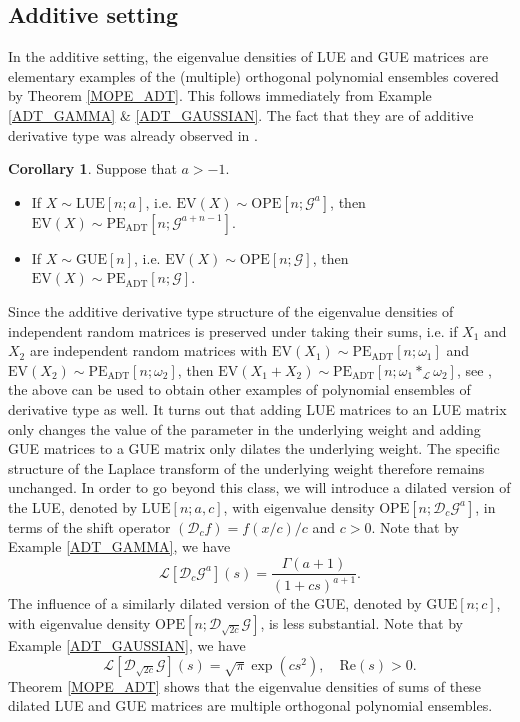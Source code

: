 \documentclass[a4paper,12pt,oneside]{article}
\theoremstyle{definition}
\newtheorem{cor}[defi]{Corollary}
\newcommand{\om}{\omega}
\newcommand{\LT}[1]{\mathcal{L}#1}
\begin{document}
\subsection{Additive setting} \label{EX_A}

In the additive setting, the eigenvalue densities of LUE and GUE matrices are elementary examples of the (multiple) orthogonal polynomial ensembles covered by Theorem \ref{MOPE_ADT}. This follows immediately from Example \ref{ADT_GAMMA} \& \ref{ADT_GAUSSIAN}. The fact that they are of additive derivative type was already observed in \cite[Ex. 2.4]{FKK:PolyaE}.

\begin{cor} \label{OPE_ADT_EX} Suppose that $a>-1$.
\begin{itemize}
    \item[$i)$] If $X\sim\text{LUE}[n;a]$, i.e. $\text{EV}(X)\sim\text{OPE}[n;\mathcal{G}^a]$, then $\text{EV}(X)\sim\text{PE}_{\text{ADT}}[n;\mathcal{G}^{a+n-1}]$.
    \item[$ii)$] If $X\sim\text{GUE}[n]$, i.e. $\text{EV}(X)\sim\text{OPE}[n;\mathcal{G}]$, then $\text{EV}(X)\sim\text{PE}_{\text{ADT}}[n;\mathcal{G}]$.
\end{itemize}
\end{cor}

Since the additive derivative type structure of the eigenvalue densities of independent random matrices is preserved under taking their sums, i.e. if $X_1$ and $X_2$ are independent random matrices with $\text{EV}(X_1)\sim\text{PE}_{\text{ADT}}[n;\om_1]$ and $\text{EV}(X_2)\sim\text{PE}_{\text{ADT}}[n;\om_2]$, then $\text{EV}(X_1+X_2)\sim\text{PE}_{\text{ADT}}[n;\om_1\ast_{\LT{}}\om_2]$, see \cite{FKK:PolyaE}, the above can be used to obtain other examples of polynomial ensembles of derivative type as well. It turns out that adding LUE matrices to an LUE matrix only changes the value of the parameter in the underlying weight and adding GUE matrices to a GUE matrix only dilates the underlying weight. The specific structure of the Laplace transform of the underlying weight therefore remains unchanged. In order to go beyond this class, we will introduce a dilated version of the LUE, denoted by $\text{LUE}[n;a,c]$, with eigenvalue density $\text{OPE}[n;\mathcal{D}_c\mathcal{G}^{a}]$, in terms of the shift operator $(\mathcal{D}_c f) =f(x/c)/c$ and $c>0$. Note that by Example \ref{ADT_GAMMA}, we have
    $$ \LT{[\mathcal{D}_c\mathcal{G}^{a}]}(s)  = \frac{\Gamma(a+1)}{(1+cs)^{a+1}}. $$
The influence of a similarly dilated version of the GUE, denoted by $\text{GUE}[n;c]$, with eigenvalue density $\text{OPE}[n;\mathcal{D}_{\sqrt{2c}}\mathcal{G}]$, is less substantial. Note that by Example \ref{ADT_GAUSSIAN}, we have
    $$ \LT{[\mathcal{D}_{\sqrt{2c}}\mathcal{G}]}(s)  = \sqrt{\pi} \exp\left(cs^2\right),\quad \text{Re}(s)>0. $$
Theorem \ref{MOPE_ADT} shows that the eigenvalue densities of sums of these dilated LUE and GUE matrices are multiple orthogonal polynomial ensembles.
\end{document}
